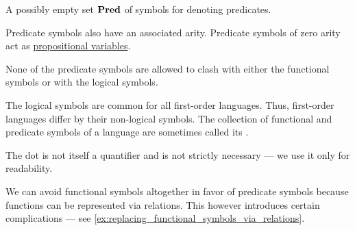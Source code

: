 \begin{definition}
\begin{description}
\begin{thmenum}[resume=def:first_order_language]
       A possibly empty  set \( \op*{Pred} \) of symbols for denoting predicates.

      Predicate symbols also have an associated arity. Predicate symbols of zero arity act as \hyperref[def:propositional_syntax/prop]{propositional variables}.

      None of the predicate symbols are allowed to clash with either the functional symbols or with the logical symbols.
    \end{thmenum}
  \end{description}

  The logical symbols are common for all first-order languages. Thus, first-order languages differ by their non-logical symbols. The collection of functional and predicate symbols of a language are sometimes called its .
\end{definition}
\begin{comments}
  \item The dot is not itself a quantifier and is not strictly necessary --- we use it only for readability.

  \item We can avoid functional symbols altogether in favor of predicate symbols because functions can be represented via relations. This however introduces certain complications --- see \cref{ex:replacing_functional_symbols_via_relations}.
\end{comments}

\begin{remark}\label{rem:first_order_abbreviations}

\end{remark}

